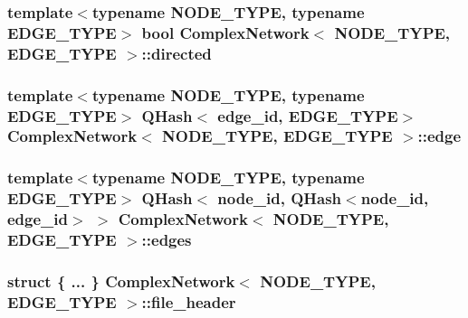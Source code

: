 \hypertarget{class_complex_network_ae1f8a32f89d84aab42475d8fe46dfa09}{
\subsubsection[{directed}]{\setlength{\rightskip}{0pt plus 5cm}template$<$typename N\+O\+D\+E\+\_\+\+T\+Y\+P\+E, typename E\+D\+G\+E\+\_\+\+T\+Y\+P\+E$>$ bool {\bf Complex\+Network}$<$ N\+O\+D\+E\+\_\+\+T\+Y\+P\+E, E\+D\+G\+E\+\_\+\+T\+Y\+P\+E $>$\+::directed\hspace{0.3cm}{\ttfamily [protected]}}}\label{class_complex_network_ae1f8a32f89d84aab42475d8fe46dfa09}
\hypertarget{class_complex_network_a666bb7ad7f5ab90416f037aeb1ba11d0}{
\subsubsection[{edge}]{\setlength{\rightskip}{0pt plus 5cm}template$<$typename N\+O\+D\+E\+\_\+\+T\+Y\+P\+E, typename E\+D\+G\+E\+\_\+\+T\+Y\+P\+E$>$ Q\+Hash$<$ {\bf edge\+\_\+id}, E\+D\+G\+E\+\_\+\+T\+Y\+P\+E$>$ {\bf Complex\+Network}$<$ N\+O\+D\+E\+\_\+\+T\+Y\+P\+E, E\+D\+G\+E\+\_\+\+T\+Y\+P\+E $>$\+::edge\hspace{0.3cm}{\ttfamily [protected]}}}\label{class_complex_network_a666bb7ad7f5ab90416f037aeb1ba11d0}
\hypertarget{class_complex_network_adbdf613ffde926399cd5f6e7b8c09536}{
\subsubsection[{edges}]{\setlength{\rightskip}{0pt plus 5cm}template$<$typename N\+O\+D\+E\+\_\+\+T\+Y\+P\+E, typename E\+D\+G\+E\+\_\+\+T\+Y\+P\+E$>$ Q\+Hash$<$ {\bf node\+\_\+id}, Q\+Hash$<${\bf node\+\_\+id}, {\bf edge\+\_\+id}$>$ $>$ {\bf Complex\+Network}$<$ N\+O\+D\+E\+\_\+\+T\+Y\+P\+E, E\+D\+G\+E\+\_\+\+T\+Y\+P\+E $>$\+::edges\hspace{0.3cm}{\ttfamily [protected]}}}\label{class_complex_network_adbdf613ffde926399cd5f6e7b8c09536}
\hypertarget{class_complex_network_ab9ab3dbbbcd8dd173ec40938391c0fc4}{
\subsubsection[{file\+\_\+header}]{\setlength{\rightskip}{0pt plus 5cm}struct \{ ... \}  {\bf Complex\+Network}$<$ N\+O\+D\+E\+\_\+\+T\+Y\+P\+E, E\+D\+G\+E\+\_\+\+T\+Y\+P\+E $>$\+::file\+\_\+header\hspace{0.3cm}{\ttfamily [protected]}}}\label{class_complex_network_ab9ab3dbbbcd8dd173ec40938391c0fc4}
